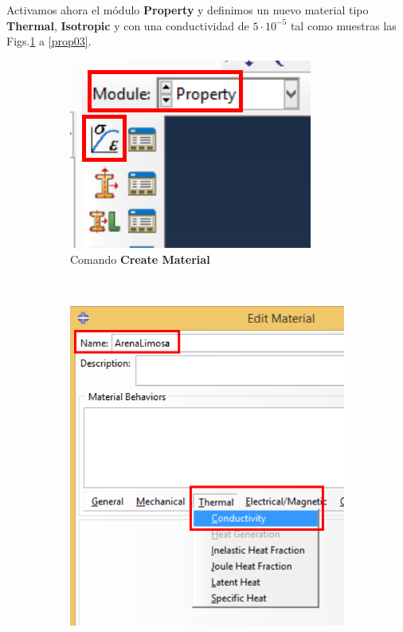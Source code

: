   Activamos ahora el módulo \textbf{Property} y definimos un nuevo
  material tipo \textbf{Thermal}, \textbf{Isotropic} y con una
  conductividad de $5\cdot 10^{-5}$ tal como muestras las
  Figs.\ref{prop01} a \ref{prop03}.
  \begin{figure}[!h]
    \centering
    \begin{subfigure}[!h]{0.22\textwidth}
      \includegraphics[width=\textwidth]{./body/images/prop01.pdf}
      \caption{Comando \textbf{Create Material}}
      \label{prop01}
    \end{subfigure}%
    ~ %
    \begin{subfigure}[!h]{0.36\textwidth}
      \includegraphics[width=\textwidth]{./body/images/prop02.pdf}

\end{subfigure}
\end{figure}
